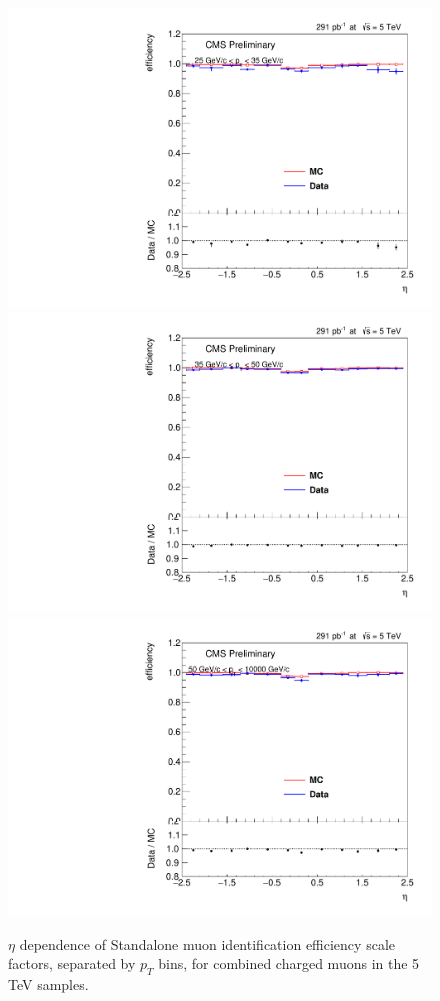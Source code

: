 \begin{figure}
\centering
\includegraphics[width=0.48\linewidth]{plots/efficiency/5_zmmsta_combined/PtBins_eta_pt0.pdf}
\includegraphics[width=0.48\linewidth]{plots/efficiency/5_zmmsta_combined/PtBins_eta_pt1.pdf}
\includegraphics[width=0.48\linewidth]{plots/efficiency/5_zmmsta_combined/PtBins_eta_pt2.pdf}
\caption{$\eta$ dependence of Standalone muon identification efficiency scale factors, separated by $p_T$ bins, for combined charged muons in the 5 TeV samples.}
\label{fig:Eff:mu:5:Sta:com}
\end{figure}
